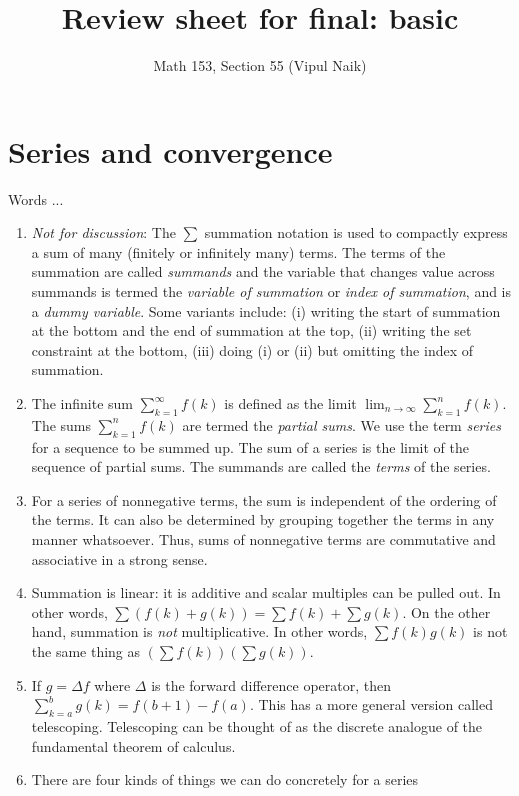 \documentclass[10pt]{amsart}
\title{Review sheet for final: basic}
\author{Math 153, Section 55 (Vipul Naik)}
\begin{document}
\maketitle

\section{Series and convergence}

Words ...

\begin{enumerate}
\item {\em Not for discussion}: The $\sum$ summation notation is used
  to compactly express a sum of many (finitely or infinitely many)
  terms. The terms of the summation are called {\em summands} and the
  variable that changes value across summands is termed the {\em
  variable of summation} or {\em index of summation}, and is a {\em
  dummy variable}. Some variants include: (i) writing the start of
  summation at the bottom and the end of summation at the top, (ii)
  writing the set constraint at the bottom, (iii) doing (i) or (ii)
  but omitting the index of summation.
\item The infinite sum $\sum_{k=1}^\infty f(k)$ is defined as the
  limit $\lim_{n \to \infty} \sum_{k=1}^n f(k)$. The sums
  $\sum_{k=1}^n f(k)$ are termed the {\em partial sums}. We use the
  term {\em series} for a sequence to be summed up. The sum of a
  series is the limit of the sequence of partial sums. The summands
  are called the {\em terms} of the series.
\item For a series of nonnegative terms, the sum is independent of the
  ordering of the terms. It can also be determined by grouping
  together the terms in any manner whatsoever. Thus, sums of
  nonnegative terms are commutative and associative in a strong sense.
\item Summation is linear: it is additive and scalar multiples can be
  pulled out. In other words, $\sum (f(k) + g(k)) = \sum f(k) + \sum
  g(k)$. On the other hand, summation is {\em not} multiplicative. In
  other words, $\sum f(k)g(k)$ is not the same thing as $(\sum
  f(k))(\sum g(k))$.
\item If $g = \Delta f$ where $\Delta$ is the forward difference
  operator, then $\sum_{k=a}^b g(k) = f(b + 1) - f(a)$. This has a
  more general version called telescoping. Telescoping can be thought
  of as the discrete analogue of the fundamental theorem of calculus.
\item There are four kinds of things we can do concretely for a series

\end{enumerate}
\end{document}
